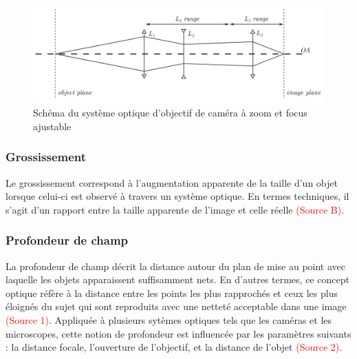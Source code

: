 \documentclass[11pt,letterpaper]{article}
\begin{document}
\begin{figure}[H]
  \centering
  \includegraphics[scale=0.1]{systeme_optique.png}
  \caption{Schéma du système optique d'objectif de caméra à zoom et focus ajustable}
  \label{schema_syst}
\end{figure}


\subsubsection{Grossissement}
Le grossissement correspond à l'augmentation apparente de la taille d'un objet lorsque celui-ci est observé à travers un système optique. En termes techniques, il s'agit d'un rapport entre la taille apparente de l'image et celle réelle \textcolor{red}{(Source B)}.


\subsubsection{Profondeur de champ}
La profondeur de champ décrit la distance autour du plan de mise au point avec laquelle les objets apparaissent suffisamment nets. En d'autres termes, ce concept optique réfère à la distance entre les points les plus rapprochés et ceux les plus éloignés du sujet qui sont reproduits avec une netteté acceptable dans une image \textcolor{red}{(Source 1)}. Appliquée à plusieurs sytèmes optiques tels que les caméras et les microscopes, cette notion de profondeur est influencée par les paramètres suivants : la distance focale, l'ouverture de l'objectif, et la distance de l'objet \textcolor{red}{(Source 2)}. 

\end{document}
